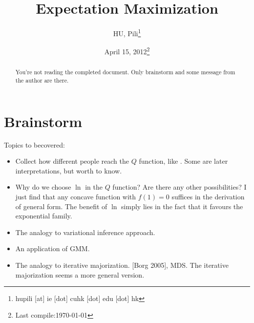 


\author{HU, Pili\thanks{hupili [at] ie [dot] cuhk [dot] edu [dot] hk}}

\title{Expectation Maximization}
\date{April 15, 2012\thanks{Last compile:\today}}



\maketitle
\begin{abstract}
	You're not reading the completed document. Only 
	brainstorm and some message from the author are there.  
\end{abstract}

\pagebreak
\tableofcontents
\pagebreak



\section{Brainstorm}

Topics to becovered:
\begin{itemize}
	\item Collect how different people reach the $Q$ function, 
		like \cite{dempster1977em}\cite{bishop2006pattern}\cite{borman2004-emtut}. 
		Some are later interpretations, but worth to know. 
	\item Why do we choose $\ln$ in the $Q$ function? 
		Are there any other possibilities? I just find that any 
		concave function with $f(1)=0$ suffices in the derivation of 
		general form. The benefit of $\ln$ simply lies in the fact 
		that it favours the exponential family. 
	\item The analogy to variational inference approach. 
	\item An application of GMM. 
	\item The analogy to iterative majorization. [Borg 2005], MDS. 
		The iterative majorization seems a more general version. 
\end{itemize}






